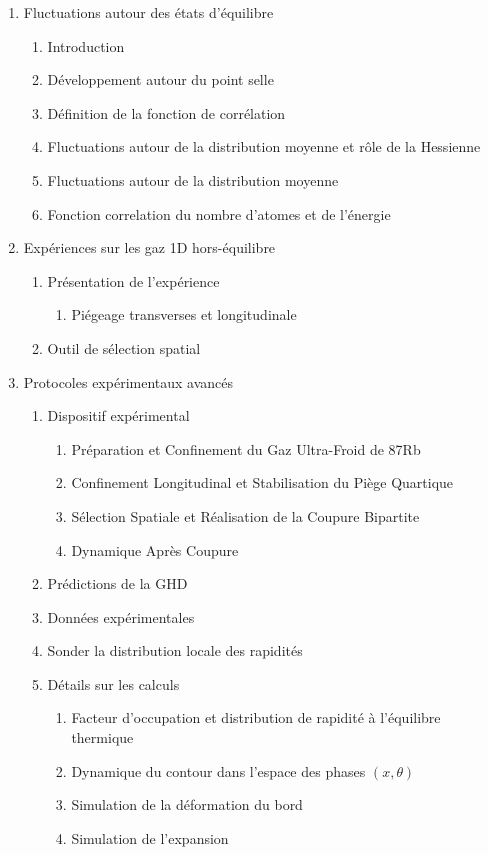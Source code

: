\documentclass[8pt, landscape]{report}
\begin{document}
\begin{multicols}{3}
\begin{enumerate}
	\item Fluctuations autour des états d’équilibre
		\begin{enumerate}
			\item Introduction
			\item Développement autour du point selle
			\item Définition de la fonction de corrélation 
			\item Fluctuations autour de la distribution moyenne et rôle de la Hessienne
			\item Fluctuations autour de la distribution moyenne
			\item Fonction correlation du nombre d’atomes et de l’énergie 
		\end{enumerate}
		
	\item Expériences sur les gaz 1D hors-équilibre
		\begin{enumerate}
			\item Présentation de l’expérience
				\begin{enumerate}
					\item Piégeage transverses et longitudinale 
				\end{enumerate}
			\item Outil de sélection spatial 
		\end{enumerate}
		
	\item Protocoles expérimentaux avancés 
		\begin{enumerate}
			\item Dispositif expérimental
				\begin{enumerate}
					\item Préparation et Confinement du Gaz Ultra-Froid de 87Rb
					\item Confinement Longitudinal et Stabilisation du Piège Quartique
					\item Sélection Spatiale et Réalisation de la Coupure Bipartite 
					\item Dynamique Après Coupure	
				\end{enumerate}
			\item Prédictions de la GHD 
			\item Données expérimentales
			\item Sonder la distribution locale des rapidités
			\item Détails sur les calculs 
				\begin{enumerate}
					\item Facteur d’occupation et distribution de rapidité à l’équilibre thermique
					\item Dynamique du contour dans l’espace des phases $(x,\theta)$
					\item Simulation de la déformation du bord
					\item Simulation de l’expansion
				\end{enumerate}
		\end{enumerate}
		

\end{enumerate}
\end{multicols}
\end{document}

